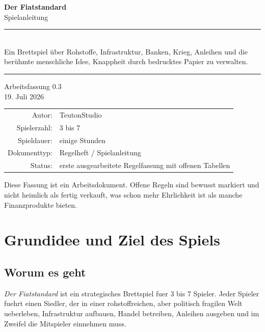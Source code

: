 \documentclass[11pt,a4paper,oneside,parskip=half]{scrreprt}
\newcommand{\DFVersion}{Arbeitsfassung 0.3}
\newcommand{\DFStand}{19. Juli 2026}
\begin{document}
\hypersetup{pageanchor=false}

\begin{titlepage}
  \centering
  \vspace*{1.8cm}
  {\Huge\bfseries Der Fiatstandard\\[0.35em]}
  {\Large Spielanleitung\\[2.0em]}

  \rule{0.78\textwidth}{0.7pt}\\[1.5em]
  {\large Ein Brettspiel über Rohstoffe, Infrastruktur, Banken, Krieg, Anleihen und die berühmte menschliche Idee, Knappheit durch bedrucktes Papier zu verwalten.\\[1.5em]}
  \rule{0.78\textwidth}{0.7pt}

  \vfill
  {\Large \DFVersion\\[0.5em]}
  {\large \DFStand\\[2.5em]}

  \begin{tabular}{rl}
    Autor: & TeutonStudio \\
    Spielerzahl: & 3 bis 7 \\
    Spieldauer: & einige Stunden \\
    Dokumenttyp: & Regelheft / Spielanleitung \\
    Status: & erste ausgearbeitete Regelfassung mit offenen Tabellen \\
  \end{tabular}

  \vfill
  {\small Diese Fassung ist ein Arbeitsdokument. Offene Regeln sind bewusst markiert und nicht heimlich als fertig verkauft, was schon mehr Ehrlichkeit ist als manche Finanzprodukte bieten.}
\end{titlepage}

\hypersetup{pageanchor=true}
\tableofcontents
\clearpage
{}

\chapter{Grundidee und Ziel des Spiels}

\section{Worum es geht}
\emph{Der Fiatstandard} ist ein strategisches Brettspiel fuer 3 bis 7 Spieler. Jeder Spieler fuehrt einen Siedler, der in einer rohstoffreichen, aber politisch fragilen Welt ueberleben, Infrastruktur aufbauen, Handel betreiben, Anleihen ausgeben und im Zweifel die Mitspieler einnehmen muss.
\end{document}
